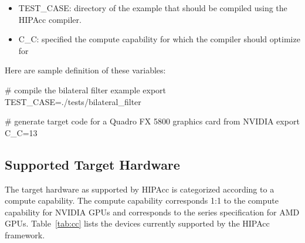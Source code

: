 \begin{itemize}
    \item TEST\_CASE: directory of the example that should be compiled using the
    \ac{HIPAcc} compiler.
    \item C\_C: specified the compute capability for which the compiler should optimize for
\end{itemize}

Here are sample definition of these variables:
\begin{code}
# compile the bilateral filter example
export TEST_CASE=./tests/bilateral_filter

# generate target code for a Quadro FX 5800 graphics card from NVIDIA
export C_C=13
\end{code}

\subsection{Supported Target Hardware}
The target hardware as supported by \ac{HIPAcc} is categorized according to a
compute capability. The compute capability corresponds 1:1 to the compute
capability for NVIDIA GPUs and corresponds to the series specification for AMD
GPUs. Table~\ref{tab:cc} lists the devices currently supported by the
\ac{HIPAcc} framework.


